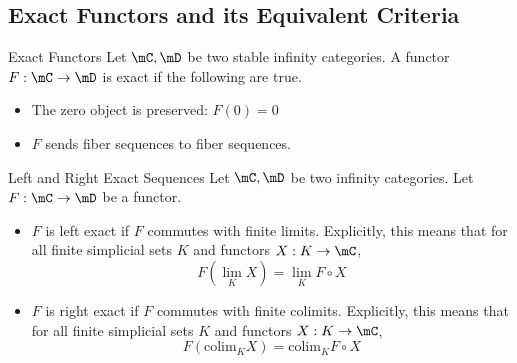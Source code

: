 \documentclass[a4paper]{article}
\begin{document}
\subsection{Exact Functors and its Equivalent Criteria}
\begin{defn}{Exact Functors}{} Let $\mC,\mD$ be two stable infinity categories. A functor $F:\mC\to\mD$ is exact if the following are true. 
\begin{itemize}
\item The zero object is preserved: $F(0)=0$
\item $F$ sends fiber sequences to fiber sequences. 
\end{itemize}
\end{defn}

\begin{defn}{Left and Right Exact Sequences}{} Let $\mC,\mD$ be two infinity categories. Let $F:\mC\to\mD$ be a functor. 
\begin{itemize}
\item $F$ is left exact if $F$ commutes with finite limits. Explicitly, this means that for all finite simplicial sets $K$ and functors $X:K\to\mC$, $$F\left(\lim_K X\right)=\lim_K F\circ X$$
\item $F$ is right exact if $F$ commutes with finite colimits. Explicitly, this means that for all finite simplicial sets $K$ and functors $X:K\to\mC$, $$F\left(\text{colim}_K X\right)=\text{colim}_K F\circ X$$
\end{itemize}
\end{defn}
\end{document}
